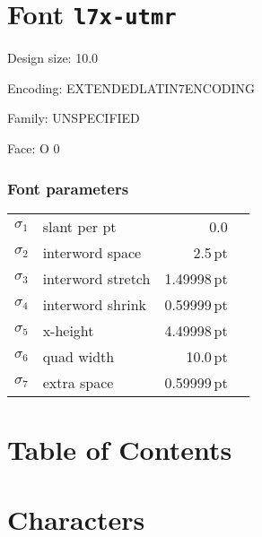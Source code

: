 \documentclass{article}
\newlength{\maxcharwidth}
\begin{document}
\setlength{\maxcharwidth}{70pt}
\addtolength{\maxcharwidth}{2\fboxsep}

\section{Font \texttt{l7x-utmr}}


Design size: 10.0\,

Encoding: EXTENDEDLATIN7ENCODING

Family: UNSPECIFIED

Face: O 0

\subsubsection{Font parameters}

\begin{tabular}{@{}llr@{\quad}l}
$\sigma_1$ & slant per pt & 0.0 \\
$\sigma_2$ & interword space & 2.5\,pt \\
$\sigma_3$ & interword stretch & 1.49998\,pt \\
$\sigma_4$ & interword shrink & 0.59999\,pt \\
$\sigma_5$ & x-height & 4.49998\,pt \\
$\sigma_6$ & quad width & 10.0\,pt \\
$\sigma_7$ & extra space & 0.59999\,pt \\
\end{tabular}

\clearpage

\section{Table of Contents}

\begingroup



\endgroup

\clearpage

\section{Characters}
\end{document}
